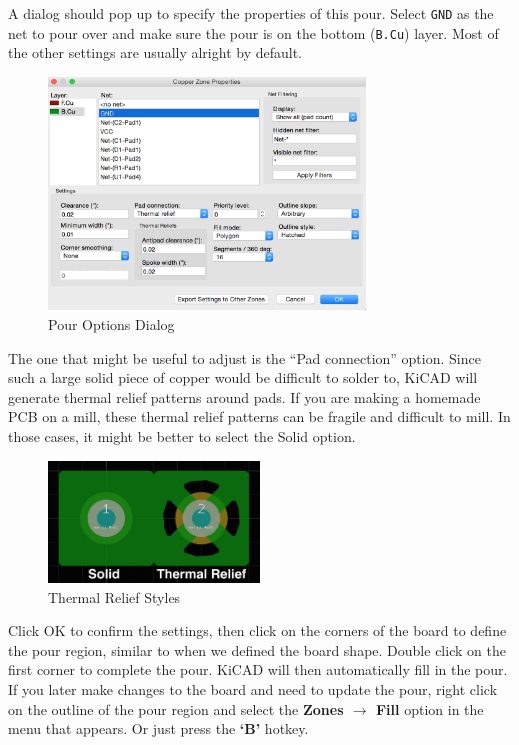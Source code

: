 \documentclass[12pt, oneside]{article}
\begin{document}
A dialog should pop up to specify the properties of this pour. Select \texttt{GND} as the net to pour over and make sure the pour is on the bottom (\texttt{B.Cu}) layer. Most of the other settings are usually alright by default. 

\begin{figure}[H]
\includegraphics[width=0.75\textwidth]{PourOptions}
\centering
\caption{Pour Options Dialog}
\end{figure}

The one that might be useful to adjust is the ``Pad connection'' option. Since such a large solid piece of copper would be difficult to solder to, KiCAD will generate thermal relief patterns around pads. If you are making a homemade PCB on a mill, these thermal relief patterns can be fragile and difficult to mill. In those cases, it might be better to select the Solid option. 

\begin{figure}[H]
\includegraphics[width=0.5\textwidth]{ThermalRelief}
\centering
\caption{Thermal Relief Styles}
\end{figure}

Click OK to confirm the settings, then click on the corners of the board to define the pour region, similar to when we defined the board shape. Double click on the first corner to complete the pour. KiCAD will then automatically fill in the pour. If you later make changes to the board and need to update the pour, right click on the outline of the pour region and select the \textbf{Zones $\rightarrow$ Fill} option in the menu that appears. Or just press the \textbf{`B'} hotkey.
\end{document}

